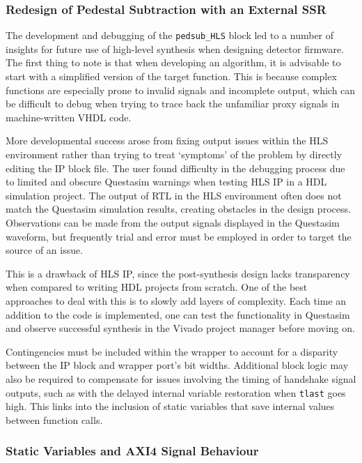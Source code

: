 \documentclass[10pt]{article}
\begin{document}
\subsubsection{Redesign of Pedestal Subtraction with an External SSR} \label{pedsub_extern_SSR}

The development and debugging of the \texttt{pedsub\_HLS} block led to a number of insights for future use of high-level synthesis when designing detector firmware. The first thing to note is that when developing an algorithm, it is advisable to start with a simplified version of the target function. This is because complex functions are especially prone to invalid signals and incomplete output, which can be difficult to debug when trying to trace back the unfamiliar proxy signals in machine-written VHDL code.

More developmental success arose from fixing output issues within the HLS environment rather than trying to treat `symptoms' of the problem by directly editing the IP block file. The user found difficulty in the debugging process due to limited and obscure Questasim warnings when testing HLS IP in a HDL simulation project. The output of RTL in the HLS environment often does not match the Questasim simulation results, creating obstacles in the design process. Observations can be made from the output signals displayed in the Questasim waveform, but frequently trial and error must be employed in order to target the source of an issue.

This is a drawback of HLS IP, since the post-synthesis design lacks transparency when compared to writing HDL projects from scratch. One of the best approaches to deal with this is to slowly add layers of complexity. Each time an addition to the code is implemented, one can test the functionality in Questasim and observe successful synthesis in the Vivado project manager before moving on.

Contingencies must be included within the wrapper to account for a disparity between the IP block and wrapper port's bit widths.  Additional block logic may also be required to compensate for issues involving the timing of handshake signal outputs, such as with the delayed internal variable restoration when \texttt{tlast} goes high. This links into the inclusion of static variables that save internal values between function calls.

\subsubsection{Static Variables and AXI4 Signal Behaviour}
\end{document}
